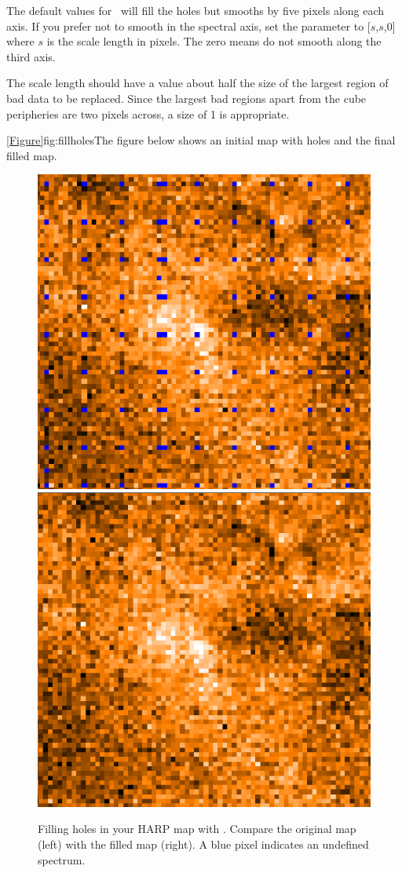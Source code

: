 \documentclass[11pt,oneside,chapters]{starlink}
\begin{document}
The default values for \fillbad\ will fill the holes but smooths by five
pixels along each axis. If you prefer not to smooth in the spectral
axis, set the parameter  to [$s$,$s$,0] where $s$ is the scale
length in pixels.  The zero means do not smooth along the third axis.

The scale length should have a value about half the size of the
largest region of bad data to be replaced.  Since the largest bad
regions apart from the cube peripheries are two pixels across, a size
of 1 is appropriate.
\begin{terminalv}
\end{terminalv}
\cref{Figure}{fig:fillholes}{The figure below} shows an initial map
with holes and the final filled map.

\begin{figure}[ht!]
\begin{center}
\includegraphics[width=0.48\linewidth]{sc20_holeyharp}
\hspace{0.5mm}
\includegraphics[width=0.48\linewidth]{sc20_polyfillaharp}
\caption[Filling holes in your HARP map with \fillbad.]{\label{fig:fillholes}
  Filling holes in your HARP map with \fillbad. Compare the original map
  (left) with the filled map (right).  A blue pixel indicates an
  undefined spectrum.}
\end{center}
\end{figure}
\end{document}
